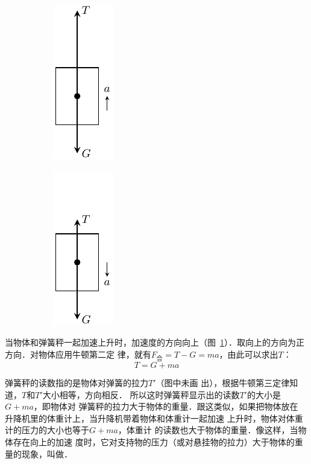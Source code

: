 \begin{figure}[htbp]
    \centering
    \begin{subfigure} {0.3\linewidth} 
        \centering
        \includegraphics{fig/A/3-13a.pdf} 
        \caption{}\label{fig_A_3-13a} 
    \end{subfigure}
    \hfil
    \begin{subfigure} {0.3\linewidth} 
        \centering
        \includegraphics{fig/A/3-13b.pdf} 
        \caption{}\label{fig_A_3-13b} 
    \end{subfigure}
    \caption{}\label{fig_A_3-13}
\end{figure}

    当物体和弹簧秤一起加速上升时，加速度的方向向上（图~\ref{fig_A_3-13a}）．取向上的方向为正方向．对物体应用牛顿第二定
律，就有$F_{\text{合}}=T-G=ma$，由此可以求出$T$：
\[ T=G+ma\]

    弹簧秤的读数指的是物体对弹簧的拉力$T'$（图中未画
出），根据牛顿第三定律知道，$T$和$T'$大小相等，方向相反．
所以这时弹簧秤显示出的读数$T'$的大小是$G+ma$，即物体对
弹簧秤的拉力大于物体的重量．跟这类似，如果把物体放在
升降机里的体重计上，当升降机带着物体和体重计一起加速
上升时，物体对体重计的压力的大小也等于$G+ma$，体重计
的读数也大于物体的重量．像这样，当物体存在向上的加速
度时，它对支持物的压力（或对悬挂物的拉力）大于物体的重
量的现象，叫做．

